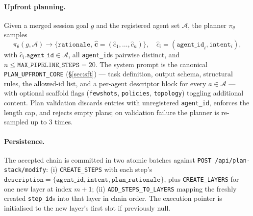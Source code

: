 \paragraph{Upfront planning.}
Given a merged session goal $g$ and the registered agent set
$\mathcal{A}$, the planner $\pi_\theta$ samples
\begin{equation*}
\pi_\theta(g,\mathcal{A})\!\to\!\{\texttt{rationale},\,\hat{\mathbf{c}}=(\hat{c}_1,\dots,\hat{c}_n)\},\quad \hat{c}_i=(\texttt{agent\_id}_i,\texttt{intent}_i),
\end{equation*}
with $\hat{c}_i.\texttt{agent\_id}\!\in\!\mathcal{A}$, all
\texttt{agent\_id}s pairwise distinct, and
$n\!\le\!\texttt{MAX\_PIPELINE\_STEPS}\!=\!20$. The system prompt is the
canonical \texttt{PLAN\_UPFRONT\_CORE} (\S\ref{sec:sft}) — task
definition, output schema, structural rules, the allowed-id list, and
a per-agent descriptor block for every $a\!\in\!\mathcal{A}$ — with
optional scaffold flags (\texttt{fewshots}, \texttt{policies},
\texttt{topology}) toggling additional content. Plan validation
discards entries with unregistered \texttt{agent\_id}, enforces the
length cap, and rejects empty plans; on validation failure the planner
is re-sampled up to $3$ times.

\paragraph{Persistence.}
The accepted chain is committed in two atomic batches against
\texttt{POST /api/plan-stack/modify}: (i) \texttt{CREATE\_STEPS} with
each step's $\texttt{description}=\{\texttt{agent\_id},\texttt{intent},\texttt{plan\_rationale}\}$,
plus \texttt{CREATE\_LAYERS} for one new layer at index $m{+}1$;
(ii) \texttt{ADD\_STEPS\_TO\_LAYERS} mapping the freshly created
\texttt{step\_id}s into that layer in chain order. The execution
pointer is initialised to the new layer's first slot if previously
null.

